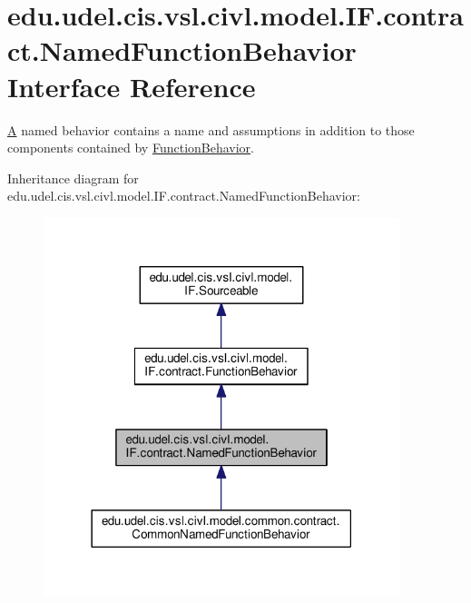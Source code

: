 \hypertarget{interfaceedu_1_1udel_1_1cis_1_1vsl_1_1civl_1_1model_1_1IF_1_1contract_1_1NamedFunctionBehavior}{}\section{edu.\+udel.\+cis.\+vsl.\+civl.\+model.\+I\+F.\+contract.\+Named\+Function\+Behavior Interface Reference}
\label{interfaceedu_1_1udel_1_1cis_1_1vsl_1_1civl_1_1model_1_1IF_1_1contract_1_1NamedFunctionBehavior}


\hyperlink{structA}{A} named behavior contains a name and assumptions in addition to those components contained by \hyperlink{interfaceedu_1_1udel_1_1cis_1_1vsl_1_1civl_1_1model_1_1IF_1_1contract_1_1FunctionBehavior}{Function\+Behavior}.  




Inheritance diagram for edu.\+udel.\+cis.\+vsl.\+civl.\+model.\+I\+F.\+contract.\+Named\+Function\+Behavior\+:
\nopagebreak
\begin{figure}[H]
\begin{center}
\leavevmode
\includegraphics[width=294pt]{interfaceedu_1_1udel_1_1cis_1_1vsl_1_1civl_1_1model_1_1IF_1_1contract_1_1NamedFunctionBehavior__inherit__graph}
\end{center}
\end{figure}


